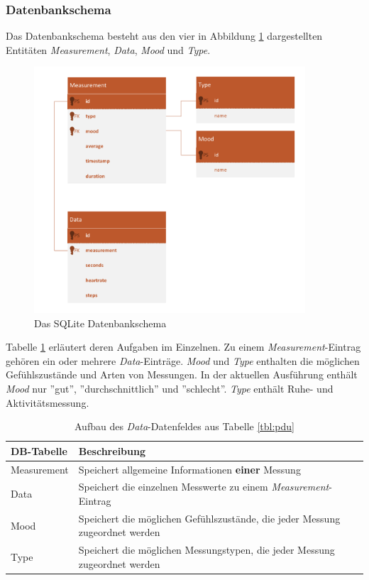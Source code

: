 \subsubsection{Datenbankschema}
Das Datenbankschema besteht aus den vier in Abbildung \ref{pic:database-scheme} dargestellten Entitäten \textit{Measurement}, \textit{Data}, \textit{Mood} und \textit{Type}. 
\begin{figure}[H]
	\centering
	\includegraphics[width=0.9\textwidth]{images/database-schema.pdf}
	\caption{Das SQLite Datenbankschema}
	\label{pic:database-scheme}
\end{figure}

Tabelle \ref{tbl:database-entities} erläutert deren Aufgaben im Einzelnen. Zu einem \textit{Measurement}-Eintrag gehören ein oder mehrere \textit{Data}-Einträge. \textit{Mood} und \textit{Type} enthalten die möglichen Gefühlszustände und Arten von Messungen. In der aktuellen Ausführung enthält \textit{Mood} nur ''gut'', ''durchschnittlich'' und ''schlecht''. \textit{Type} enthält Ruhe- und Aktivitätsmessung.  
\begin{table}[h]
	\centering
		\begin{tabularx}{\textwidth}{l|X}
			\hline
			DB-Tabelle & Beschreibung \\
			\hline
			\hline
			Measurement & Speichert allgemeine Informationen \textbf{einer} Messung\\
			\hline
			Data & Speichert die einzelnen Messwerte zu einem \textit{Measurement}-Eintrag\\
			\hline
			Mood & Speichert die möglichen Gefühlszustände, die jeder Messung zugeordnet werden\\
			\hline
			Type & Speichert die möglichen Messungstypen, die jeder Messung zugeordnet werden\\
			\hline
		\end{tabularx}
		\caption{Aufbau des \textit{Data}-Datenfeldes aus Tabelle \ref{tbl:pdu}}
		\label{tbl:database-entities}			
\end{table}

